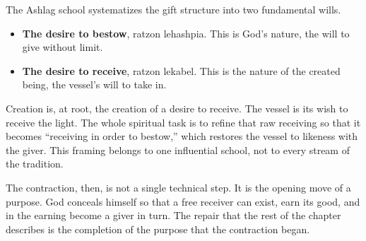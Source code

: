 The Ashlag school systematizes the gift structure into two fundamental wills.

\begin{itemize}
 \item \textbf{The desire to bestow}, ratzon lehashpia. This is God's nature, the
 will to give without limit.
 \item \textbf{The desire to receive}, ratzon lekabel. This is the nature of the
 created being, the vessel's will to take in.
\end{itemize}

Creation is, at root, the creation of a desire to receive. The vessel is its wish to
receive the light. The whole spiritual task is to refine that raw receiving so that it
becomes \enquote{receiving in order to bestow,} which restores the vessel to likeness
with the giver. This framing belongs to one influential school, not to every stream of
the tradition.

The contraction, then, is not a single technical step. It is the opening move of a
purpose. God conceals himself so that a free receiver can exist, earn its good, and in
the earning become a giver in turn. The repair that the rest of the chapter describes
is the completion of the purpose that the contraction began.
